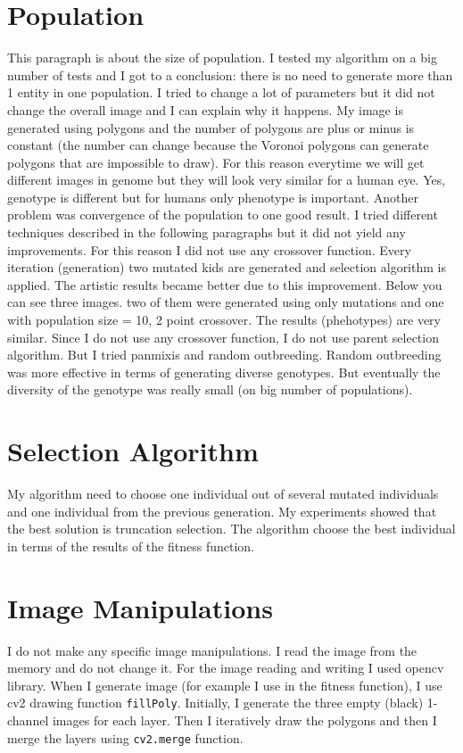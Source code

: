 \documentclass{article}
\begin{document}
\section{Population}
This paragraph is about the size of population. I tested my algorithm on a big number of tests and I got to a conclusion: there is no need to generate more than 1 entity in one population. I tried to change a lot of parameters but it did not change the overall image and I can explain why it happens. My image is generated using polygons and the number of polygons are plus or minus is constant (the number can change because the Voronoi polygons can generate polygons that are impossible to draw). For this reason everytime we will get different images in genome but they will look very similar for a human eye. Yes, genotype is different but for humans only phenotype is important. Another problem was convergence of the population to one good result. I tried different techniques described in the following paragraphs but it did not yield any improvements. For this reason I did not use any crossover function. Every iteration (generation) two mutated kids are generated and selection algorithm is applied. The artistic results became better due to this improvement. Below you can see three images. two of them were generated using only mutations and one with population size = 10, 2 point crossover. The results (phehotypes) are very similar. Since I do not use any crossover function, I do not use parent selection algorithm. But I tried panmixis and random outbreeding. Random outbreeding was more effective in terms of generating diverse genotypes. But eventually the diversity of the genotype was really small (on big number of populations).
\section{Selection Algorithm}
My algorithm need to choose one individual out of several mutated individuals and one individual from the previous generation. My experiments showed that the best solution is truncation selection. The algorithm choose the best individual in terms of the results of the fitness function. 


\section{Image Manipulations}
I do not make any specific image manipulations. I read the image from the memory and do not change it. For the image reading and writing I used opencv library. When I generate image (for example I use in the fitness function), I use cv2 drawing function \texttt{fillPoly}. Initially, I generate the three empty (black) 1-channel images for each layer. Then I iteratively draw the polygons and then I merge the layers using \texttt{cv2.merge} function. 
\end{document}
